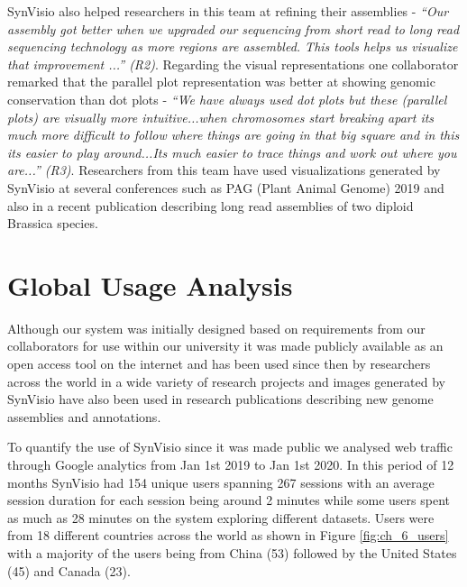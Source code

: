 SynVisio also helped researchers in this team at refining their assemblies - \textit{``Our assembly got better when we upgraded our sequencing from short read to long read sequencing technology as more regions are assembled. This tools helps us visualize that improvement ...'' (R2)}. Regarding the visual representations one collaborator remarked that the parallel plot representation was better at showing genomic conservation than dot plots - \textit{``We have always used dot plots but these (parallel plots) are visually more intuitive...when chromosomes start breaking apart its much more difficult to follow where things are going in that big square and in this its easier to play around...Its much easier to trace things and work out where you are...'' (R3)}. Researchers from this team have used visualizations generated by SynVisio at several conferences such as PAG (Plant Animal Genome) 2019 \cite{brassicapag} and also in a recent publication describing long read assemblies of two diploid Brassica species\cite{perumal2020high}.
 
\section{Global Usage Analysis}

Although our system was initially designed based on requirements from our collaborators for use within our university it was made publicly available as an open access tool on the internet and has been used since then by researchers across the world in a wide variety of research projects and images generated by SynVisio have also been used in research publications describing new genome assemblies and annotations\cite{mathers2020improved,perumal2020high}.

To quantify the use of SynVisio since it was made public we analysed web traffic through Google analytics  from Jan 1st 2019 to Jan 1st 2020. In this period of 12 months SynVisio had 154 unique users spanning 267 sessions with an average session duration for each session being around 2 minutes while some users spent as much as 28 minutes on the system exploring different datasets. Users were from 18 different countries across the world as shown in Figure \ref{fig:ch_6_users} with a majority of the users being from China (53) followed by the United States (45) and Canada (23).

